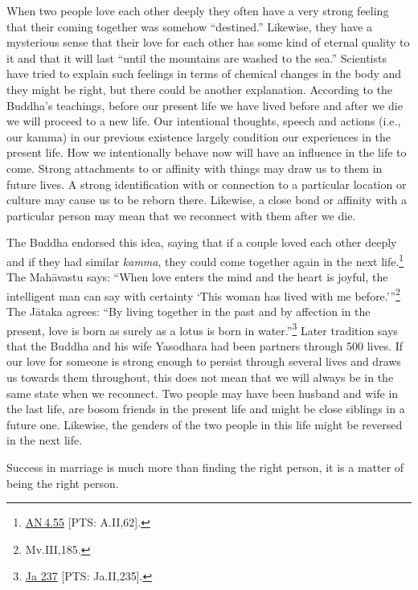 \documentclass[10pt, openright]{book}
\newenvironment{epigram-2}%
{%
\vspace{1em}
\noindent
\quoting[leftmargin=2.5cm,rightmargin=2.5cm]%
\begin{itshape}
\large
}%
{\end{itshape}\endquoting
}%
\begin{document}
When two people love each other deeply they often have a very strong feeling that their coming together was somehow “destined.” Likewise, they have a mysterious sense that their love for each other has some kind of eternal quality to it and that it will last “until the mountains are washed to the sea.” Scientists have tried to explain such feelings in terms of chemical changes in the body and they might be right, but there could be another explanation. According to the Buddha’s teachings, before our present life we have lived before and after we die we will proceed to a new life. Our intentional thoughts, speech and actions (i.e., our kamma) in our previous existence largely condition our experiences in the present life. How we intentionally behave now will have an influence in the life to come. Strong attachments to or affinity with things may draw us to them in future lives. A strong identification with or connection to a particular location or culture may cause us to be reborn there. Likewise, a close bond or affinity with a particular person may mean that we reconnect with them after we die.


The Buddha endorsed this idea, saying that if a couple loved each other deeply and if they had similar \textit{kamma}, they could come together again in the next life.\footnote {\href{https://suttacentral.net/an4.55/en/sujato}{AN 4.55} [PTS: A.II,62].} The Mahāvastu says: “When love enters the mind and the heart is joyful, the intelligent man can say with certainty ‘This woman has lived with me before.’”\footnote {Mv.III,185.} The Jātaka agrees: “By living together in the past and by affection in the present, love is born as surely as a lotus is born in water.”\footnote {\href{https://suttacentral.net/ja237/en/rouse}{Ja 237} [PTS: Ja.II,235].} Later tradition says that the Buddha and his wife Yasodhara had been partners through 500 lives. If our love for someone is strong enough to persist through several lives and draws us towards them throughout, this does not mean that we will always be in the same state when we reconnect. Two people may have been husband and wife in the last life, are bosom friends in the present life and might be close siblings in a future one. Likewise, the genders of the two people in this life might be reversed in the next life.


\begin{epigram-2}
Success in marriage is much more than finding the right person, it is a matter of being the right person.
\end{epigram-2}
\end{document}
